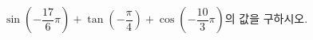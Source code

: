 $\sin\left(-\dfrac{17}{6}\pi\right)+\tan\left(-\dfrac{\pi}{4}\right)+\cos\left(-\dfrac{10}{3}\pi\right)$의 값을 구하시오.
